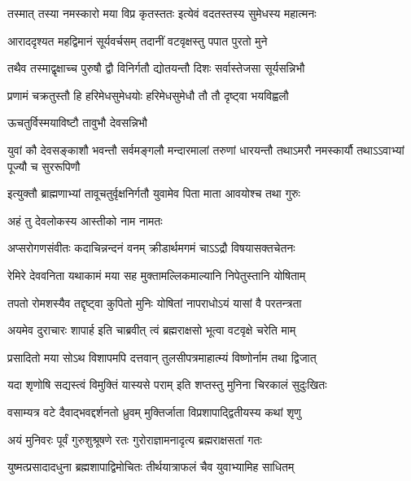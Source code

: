 \twolineshloka
{तस्मात् तस्या नमस्कारो मया विप्र कृतस्ततः}
{इत्येवं वदतस्तस्य सुमेधस्य महात्मनः} %

\twolineshloka
{आराददृश्यत महद्विमानं सूर्यवर्चसम्}
{तदानीं वटवृक्षस्तु पपात पुरतो मुने} %

\twolineshloka
{तथैव तस्माद्वृक्षाच्च पुरुषौ द्वौ विनिर्गतौ}
{द्योतयन्तौ दिशः सर्वास्तेजसा सूर्यसन्निभौ} %

\twolineshloka
{प्रणामं चक्रतुस्तौ हि हरिमेधसुमेधयोः}
{हरिमेधसुमेधौ तौ तौ दृष्ट्वा भयविह्वलौ} %


\onelineshloka
{ऊचतुर्विस्मयाविष्टौ तावुभौ देवसन्निभौ} %



\threelineshloka
{युवां कौ देवसङ्काशौ भवन्तौ सर्वमङ्गलौ}
{मन्दारमालां तरुणां धारयन्तौ तथाऽमरौ}
{नमस्कार्यौ तथाऽऽवाभ्यां पूज्यौ च सुररूपिणौ} %

\twolineshloka
{इत्युक्तौ ब्राह्मणाभ्यां तावूचतुर्वृक्षनिर्गतौ}
{युवामेव पिता माता आवयोश्च तथा गुरुः} %




\onelineshloka
{अहं तु देवलोकस्य आस्तीको नाम नामतः} %

\twolineshloka
{अप्सरोगणसंवीतः कदाचिन्नन्दनं वनम्}
{क्रीडार्थमगमं चाऽऽद्रौ विषयासक्तचेतनः} %

\twolineshloka
{रेमिरे देववनिता यथाकामं मया सह}
{मुक्तामल्लिकमाल्यानि निपेतुस्तानि योषिताम्} %

\twolineshloka
{तपतो रोमशस्यैव तद्दृष्ट्वा कुपितो मुनिः}
{योषितां नापराधोऽयं यासां वै परतन्त्रता} %

\twolineshloka
{अयमेव दुराचारः शापार्ह इति चाब्रवीत्}
{त्वं ब्रह्मराक्षसो भूत्वा वटवृक्षे चरेति माम्} %

\twolineshloka
{प्रसादितो मया सोऽथ विशापमपि दत्तवान्}
{तुलसीपत्रमाहात्म्यं विष्णोर्नाम तथा द्विजात्} %

\twolineshloka
{यदा शृणोषि सद्यस्त्वं विमुक्तिं यास्यसे पराम्}
{इति शप्तस्तु मुनिना चिरकालं सुदुःखितः} %

\twolineshloka
{वसाम्यत्र वटे दैवाद्भवद्दर्शनतो ध्रुवम्}
{मुक्तिर्जाता विप्रशापाद्द्वितीयस्य कथां शृणु} %

\twolineshloka
{अयं मुनिवरः पूर्वं गुरुशुश्रूषणे रतः}
{गुरोराज्ञामनादृत्य ब्रह्मराक्षसतां गतः} %

\twolineshloka
{युष्मत्प्रसादादधुना ब्रह्मशापाद्विमोचितः}
{तीर्थयात्राफलं चैव युवाभ्यामिह साधितम्} %

